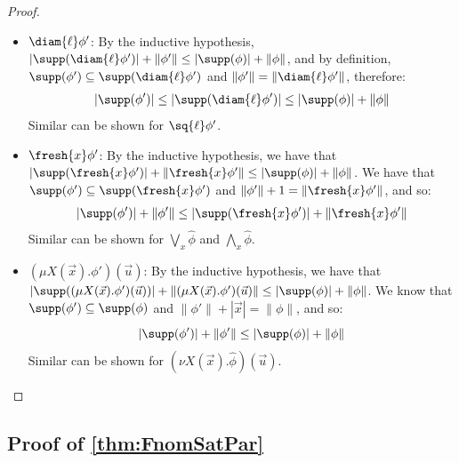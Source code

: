 \begin{proof}
\begin{enumerate}
\begin{itemize}
\[			\]
			Similar can be shown for $\phi_1 \land \phi_2$.
			\item $\diam{\ell} \phi'$: By the inductive hypothesis, $|\supp(\diam{\ell}\phi')| + \|\phi'\| \le |\supp(\phi)| + \|\phi\|$, and by definition, $\supp(\phi')\subseteq \supp(\diam{\ell}\phi')$ and $\|\phi'\| = \|\diam{\ell}\phi'\|$, therefore:
			\[
			|\supp(\phi')| \le |\supp(\diam{\ell}\phi')| \le |\supp(\phi)| + \|\phi\|
			\]
			Similar can be shown for $\sq{\ell} \phi'$.
			\item $\fresh{x} \phi'$: By the inductive hypothesis, we have that $|\supp(\fresh{x} \phi')| + \|\fresh{x} \phi'\| \le |\supp(\phi)| + \|\phi\|$. 
			We have that $\supp(\phi') \subseteq \supp(\fresh{x} \phi')$ and $\|\phi'\| + 1= \|\fresh{x}\phi' \|$, and so:
			\[
				|\supp(\phi')| + \|\phi'\| \le |\supp(\fresh{x}\phi')| + \|\fresh{x}\phi'\|
			\]
			Similar can be shown for $\bigvee_x \hat \phi$ and $\bigwedge_x \hat \phi$.
			\item $(\mu X(\vec x).\phi')(\vec u)$: By the inductive hypothesis, we have that $|\supp((\mu X(\vec x).\phi')(\vec u))| + \|(\mu X(\vec x).\phi')(\vec u)\| \le |\supp(\phi)| + \|\phi\|$. 
			We know that $\supp(\phi') \subseteq \supp(\phi)$ and $\|\phi'\| + |\vec x| = \|\phi\|$, and so:
			\[
				|\supp(\phi')| + \|\phi'\| \le |\supp(\phi)| + \|\phi\|
			\]
			Similar can be shown for $(\nu X(\vec x).\hat \phi)(\vec u)$.
		\end{itemize}
	\end{enumerate}
\end{proof}

\subsection{Proof of \cref{thm:FnomSatPar}}

